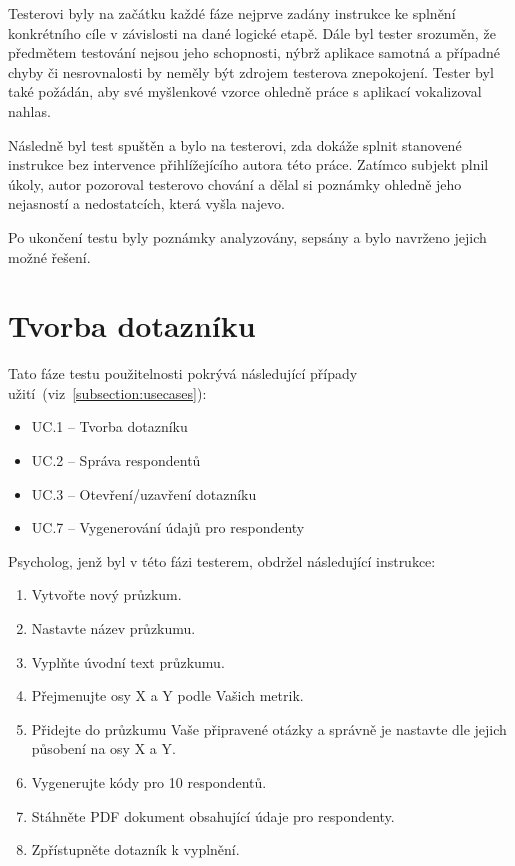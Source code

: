 Testerovi byly na začátku každé fáze nejprve zadány instrukce ke splnění konkrétního cíle
v závislosti na dané logické etapě. Dále byl tester srozuměn,
že předmětem testování nejsou jeho schopnosti, nýbrž aplikace samotná a případné
chyby či nesrovnalosti by neměly být zdrojem testerova znepokojení. Tester byl
také požádán, aby své myšlenkové vzorce ohledně práce s aplikací vokalizoval nahlas.

Následně byl test spuštěn a bylo na testerovi, zda dokáže splnit stanovené instrukce
bez intervence přihlížejícího autora této práce. Zatímco subjekt plnil úkoly,
autor pozoroval testerovo chování a dělal si poznámky ohledně jeho nejasností 
a nedostatcích, která vyšla najevo.

Po ukončení testu byly poznámky analyzovány, sepsány a bylo navrženo jejich možné řešení.

\section{Tvorba dotazníku}
Tato fáze testu použitelnosti pokrývá následující případy užití~(viz~\ref{subsection:usecases}):

\begin{itemize}
    \item UC.1 – Tvorba dotazníku
    \item UC.2 – Správa respondentů
    \item UC.3 – Otevření/uzavření dotazníku
    \item UC.7 – Vygenerování údajů pro respondenty
\end{itemize}

Psycholog, jenž byl v této fázi testerem, obdržel následující instrukce:

\begin{enumerate}
    \item Vytvořte nový průzkum.
    \item Nastavte název průzkumu.
    \item Vyplňte úvodní text průzkumu.
    \item Přejmenujte osy X a Y podle Vašich metrik.
    \item Přidejte do průzkumu Vaše připravené otázky a správně
    je nastavte dle jejich působení na osy X a Y.
    \item Vygenerujte kódy pro 10 respondentů.
    \item Stáhněte PDF dokument obsahující údaje pro respondenty.
    \item Zpřístupněte dotazník k vyplnění.
\end{enumerate}

